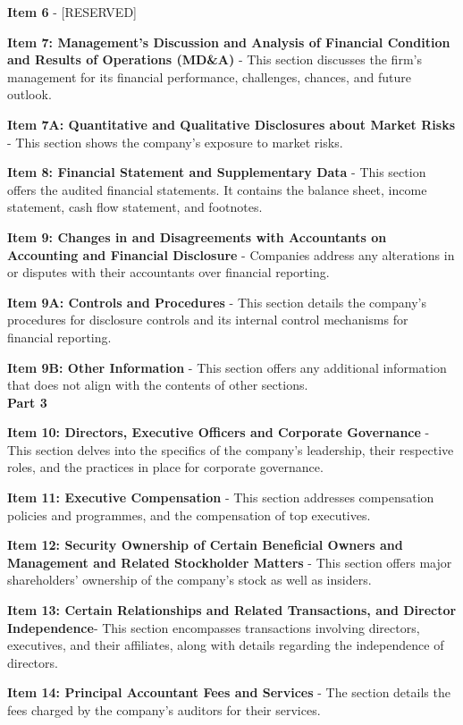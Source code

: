 \documentclass[logo,bsc,singlespacing,parskip]{infthesis}
\begin{document}
\textbf{Item 6} - [RESERVED]

\textbf{Item 7: Management’s Discussion and Analysis of Financial Condition and Results of Operations (MD&A)} - This section discusses the firm’s management for its financial performance, challenges, chances, and future outlook.

\textbf{Item 7A: Quantitative and Qualitative Disclosures about Market Risks} - This section shows the company’s exposure to market risks.

\textbf{Item 8: Financial Statement and Supplementary Data} - This section offers the audited financial statements. It contains the balance sheet, income statement, cash flow statement, and footnotes. 

\textbf{Item 9: Changes in and Disagreements with Accountants on Accounting and Financial Disclosure} - Companies address any alterations in or disputes with their accountants over financial reporting.

\textbf{Item 9A: Controls and Procedures} - This section details the company’s procedures for disclosure controls and its internal control mechanisms for financial reporting. 

\textbf{Item 9B: Other Information} - This section offers any additional information that does not align with the contents of other sections. \\


\textbf{Part 3} 


\textbf{Item 10: Directors, Executive Officers and Corporate Governance} - This section delves into the specifics of the company’s leadership, their respective roles, and the practices in place for corporate governance.

\textbf{Item 11: Executive Compensation} - This section addresses compensation policies and programmes, and the compensation of top executives. 

\textbf{Item 12: Security Ownership of Certain Beneficial Owners and Management and Related Stockholder Matters} - This section offers major shareholders’ ownership of the company’s stock as well as insiders.

\textbf{Item 13: Certain Relationships and Related Transactions, and Director Independence}- This section encompasses transactions involving directors, executives, and their affiliates, along with details regarding the independence of directors.

\textbf{Item 14: Principal Accountant Fees and Services} - The section details the fees charged by the company’s auditors for their services. \\
\end{document}
